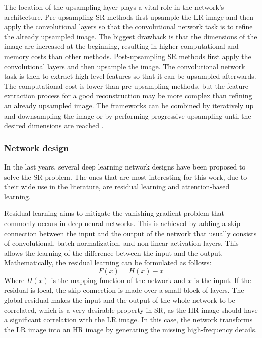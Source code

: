         The location of the upsampling layer plays a vital role in the network's architecture. Pre-upsampling SR methods first upsample the LR image and then apply the convolutional layers so that the convolutional network task is to refine the already upsampled image. The biggest drawback is that the dimensions of the image are increased at the beginning, resulting in higher computational and memory costs than other methods.
        Post-upsampling SR methods first apply the convolutional layers and then upsample the image. The convolutional network task is then to extract high-level features so that it can be upsampled afterwards. The computational cost is lower than pre-upsampling methods, but the feature extraction process for a good reconstruction may be more complex than refining an already upsampled image. 
        The frameworks can be combined by iteratively up and downsampling the image \cite{timofte2015seven} or by performing progressive upsampling until the desired dimensions are reached \cite{lai2017deep}.

        \subsubsection{Network design}

        In the last years, several deep learning network designs have been proposed to solve the SR problem. The ones that are most interesting for this work, due to their wide use in the literature, are residual learning and attention-based learning. 
        
        Residual learning aims to mitigate the vanishing gradient problem that commonly occurs in deep neural networks. This is achieved by adding a skip connection between the input and the output of the network that usually consists of convolutional, batch normalization, and non-linear activation layers. This allows the learning of the difference between the input and the output. Mathematically, the residual learning can be formulated as follows:
        \begin{equation}
            F(x) = H(x) - x
            \label{eq:2-residual-learning}
        \end{equation}
        Where $H(x)$ is the mapping function of the network and $x$ is the input. If the residual is local, the skip connection is made over a small block of layers. The global residual makes the input and the output of the whole network to be correlated, which is a very desirable property in SR, as the HR image should have a significant correlation with the LR image. In this case, the network transforms the LR image into an HR image by generating the missing high-frequency details. 
        
